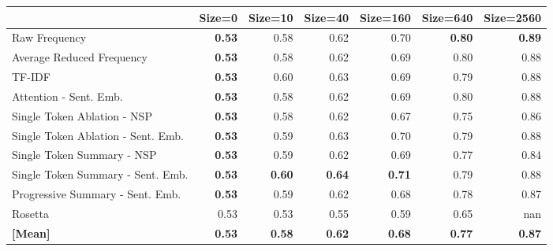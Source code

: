 \begin{tabular}{lrrrrrr}
\toprule
 & Size=0 & Size=10 & Size=40 & Size=160 & Size=640 & Size=2560 \\
\midrule
Raw Frequency & \cellcolor[RGB]{63,83,198}\textbf{0.53} & \cellcolor[RGB]{105,139,239}0.58 & \cellcolor[RGB]{142,177,253}0.62 & \cellcolor[RGB]{214,219,228}0.70 & \cellcolor[RGB]{243,152,121}\textbf{0.80} & \cellcolor[RGB]{179,3,38}\textbf{0.89} \\
Average Reduced Frequency & \cellcolor[RGB]{63,83,198}\textbf{0.53} & \cellcolor[RGB]{105,139,239}0.58 & \cellcolor[RGB]{141,175,253}0.62 & \cellcolor[RGB]{211,219,230}0.69 & \cellcolor[RGB]{244,154,123}0.80 & \cellcolor[RGB]{181,8,39}0.88 \\
TF-IDF & \cellcolor[RGB]{63,83,198}\textbf{0.53} & \cellcolor[RGB]{123,158,248}0.60 & \cellcolor[RGB]{156,188,254}0.63 & \cellcolor[RGB]{213,219,229}0.69 & \cellcolor[RGB]{244,155,124}0.79 & \cellcolor[RGB]{184,17,41}0.88 \\
Attention - Sent. Emb. & \cellcolor[RGB]{63,83,198}\textbf{0.53} & \cellcolor[RGB]{105,139,239}0.58 & \cellcolor[RGB]{146,180,254}0.62 & \cellcolor[RGB]{213,219,229}0.69 & \cellcolor[RGB]{244,154,123}0.80 & \cellcolor[RGB]{182,13,40}0.88 \\
Single Token Ablation - NSP & \cellcolor[RGB]{63,83,198}\textbf{0.53} & \cellcolor[RGB]{105,139,239}0.58 & \cellcolor[RGB]{141,175,253}0.62 & \cellcolor[RGB]{194,212,243}0.67 & \cellcolor[RGB]{243,197,175}0.75 & \cellcolor[RGB]{205,66,58}0.86 \\
Single Token Ablation - Sent. Emb. & \cellcolor[RGB]{63,83,198}\textbf{0.53} & \cellcolor[RGB]{116,151,245}0.59 & \cellcolor[RGB]{152,185,254}0.63 & \cellcolor[RGB]{217,220,224}0.70 & \cellcolor[RGB]{244,155,124}0.79 & \cellcolor[RGB]{182,13,40}0.88 \\
Single Token Summary - NSP & \cellcolor[RGB]{63,83,198}\textbf{0.53} & \cellcolor[RGB]{119,154,246}0.59 & \cellcolor[RGB]{149,183,254}0.62 & \cellcolor[RGB]{206,217,235}0.69 & \cellcolor[RGB]{246,183,156}0.77 & \cellcolor[RGB]{223,100,79}0.84 \\
Single Token Summary - Sent. Emb. & \cellcolor[RGB]{63,83,198}\textbf{0.53} & \cellcolor[RGB]{126,161,249}\textbf{0.60} & \cellcolor[RGB]{163,193,254}\textbf{0.64} & \cellcolor[RGB]{222,219,218}\textbf{0.71} & \cellcolor[RGB]{244,157,126}0.79 & \cellcolor[RGB]{190,35,45}0.88 \\
Progressive Summary - Sent. Emb. & \cellcolor[RGB]{63,83,198}\textbf{0.53} & \cellcolor[RGB]{116,151,245}0.59 & \cellcolor[RGB]{145,179,254}0.62 & \cellcolor[RGB]{202,216,238}0.68 & \cellcolor[RGB]{246,170,140}0.78 & \cellcolor[RGB]{191,40,46}0.87 \\
Rosetta & \cellcolor[RGB]{58,76,192}0.53 & \cellcolor[RGB]{62,81,196}0.53 & \cellcolor[RGB]{78,105,216}0.55 & \cellcolor[RGB]{112,147,243}0.59 & \cellcolor[RGB]{178,203,251}0.65 & \cellcolor[RGB]{0,0,0}nan \\
\midrule 
\textbf{[Mean]} & \textbf{0.53} & \textbf{0.58} & \textbf{0.62} & \textbf{0.68} & \textbf{0.77} & \textbf{0.87} \\
\bottomrule
\end{tabular}
